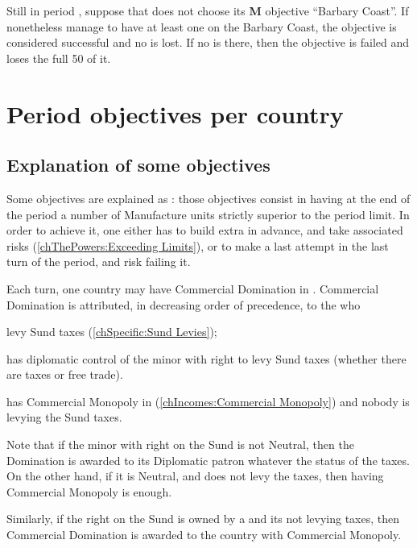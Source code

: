 \begin{exemple}
  Still in period , suppose that \HIS does not choose its {\bf M}
  objective ``Barbary Coast''. If \HIS nonetheless manage to have at least one
  \Presidio on the Barbary Coast, the objective is considered successful and
  no \VP is lost. If no \Presidio is there, then the objective is failed and
  \HIS loses the full 50 \VPs of it.
\end{exemple}

\section{Period objectives per country}
\label{chVictories:objectives}

\subsection{Explanation of some objectives}

\aparag[MNU.] Some objectives are explained as \MNU: those objectives
consist in having at the end of the period a number of Manufacture units
strictly superior to the period limit.
\bparag In order to achieve it, one either has to build extra \MNU in
advance, and take associated risks (\ref{chThePowers:Exceeding Limits}),
or to make a last attempt in the last turn of the period, and risk
failing it.

 Each turn, one country
may have Commercial Domination in . Commercial Domination
is attributed, in decreasing order of precedence, to the \MAJ who
\begin{modlist}
\item levy Sund taxes (\ref{chSpecific:Sund Levies});
\item has diplomatic control of the minor with right to levy Sund taxes
  (whether there are taxes or free trade).
\item has Commercial Monopoly in 
  (\ref{chIncomes:Commercial Monopoly}) and nobody is levying the Sund
  taxes.
\end{modlist}

\begin{designnote}
  Note that if the minor with right on the Sund is not Neutral, then the
  Domination is awarded to its Diplomatic patron whatever the status of
  the taxes. On the other hand, if it is Neutral, and does not levy the
  taxes, then having Commercial Monopoly is enough.

  Similarly, if the right on the Sund is owned by a \MAJ and its not
  levying taxes, then Commercial Domination is awarded to the country
  with Commercial Monopoly.
\end{designnote}

